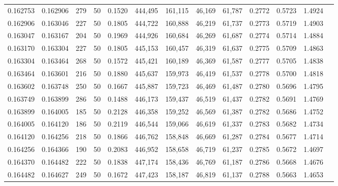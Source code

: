 \begin{tabular}{rrrrrrrrrrrrr}
0.162753 & 0.162906 &   279 &  50 &                                     0.1520 & 444,495 & 161,115 &  46,169 &  61,787 & 0.2772 & 0.5723 & 1.4924 \\
0.162906 & 0.163046 &   227 &  50 &                                     0.1805 & 444,722 & 160,888 &  46,219 &  61,737 & 0.2773 & 0.5719 & 1.4903 \\
0.163047 & 0.163167 &   204 &  50 &                                     0.1969 & 444,926 & 160,684 &  46,269 &  61,687 & 0.2774 & 0.5714 & 1.4884 \\
0.163170 & 0.163304 &   227 &  50 &                                     0.1805 & 445,153 & 160,457 &  46,319 &  61,637 & 0.2775 & 0.5709 & 1.4863 \\
0.163304 & 0.163464 &   268 &  50 &                                     0.1572 & 445,421 & 160,189 &  46,369 &  61,587 & 0.2777 & 0.5705 & 1.4838 \\
0.163464 & 0.163601 &   216 &  50 &                                     0.1880 & 445,637 & 159,973 &  46,419 &  61,537 & 0.2778 & 0.5700 & 1.4818 \\
0.163602 & 0.163748 &   250 &  50 &                                     0.1667 & 445,887 & 159,723 &  46,469 &  61,487 & 0.2780 & 0.5696 & 1.4795 \\
0.163749 & 0.163899 &   286 &  50 &                                     0.1488 & 446,173 & 159,437 &  46,519 &  61,437 & 0.2782 & 0.5691 & 1.4769 \\
0.163899 & 0.164005 &   185 &  50 &                                     0.2128 & 446,358 & 159,252 &  46,569 &  61,387 & 0.2782 & 0.5686 & 1.4752 \\
0.164005 & 0.164120 &   186 &  50 &                                     0.2119 & 446,544 & 159,066 &  46,619 &  61,337 & 0.2783 & 0.5682 & 1.4734 \\
0.164120 & 0.164256 &   218 &  50 &                                     0.1866 & 446,762 & 158,848 &  46,669 &  61,287 & 0.2784 & 0.5677 & 1.4714 \\
0.164256 & 0.164366 &   190 &  50 &                                     0.2083 & 446,952 & 158,658 &  46,719 &  61,237 & 0.2785 & 0.5672 & 1.4697 \\
0.164370 & 0.164482 &   222 &  50 &                                     0.1838 & 447,174 & 158,436 &  46,769 &  61,187 & 0.2786 & 0.5668 & 1.4676 \\
0.164482 & 0.164627 &   249 &  50 &                                     0.1672 & 447,423 & 158,187 &  46,819 &  61,137 & 0.2788 & 0.5663 & 1.4653 \\

\end{tabular}
